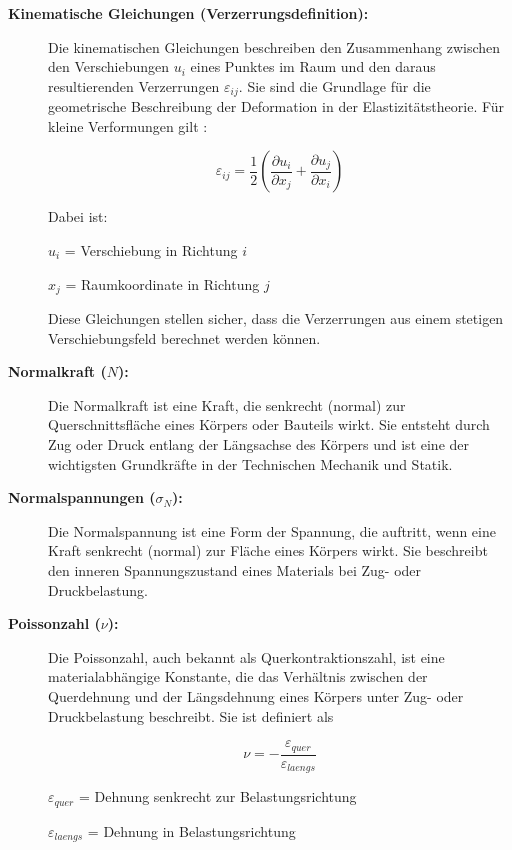 \begin{description}
	\item[\textbf{Kinematische Gleichungen (Verzerrungsdefinition):}] Die kinematischen Gleichungen beschreiben den Zusammenhang zwischen den Verschiebungen $u_i$ eines Punktes im Raum und den daraus resultierenden Verzerrungen $\varepsilon_{ij}$. 
	Sie sind die Grundlage für die geometrische Beschreibung der Deformation in der Elastizitätstheorie. 
	Für kleine Verformungen gilt \cite{elastomechanik:Technische Mechanik 2:Elastostatik}:

	\begin{equation}
		\varepsilon_{ij} = 
		\frac{1}{2} \left( \frac{\partial u_i}{\partial x_j} + \frac{\partial u_j}{\partial x_i} \right)
	\end{equation}
	
	Dabei ist:
	
		$u_i$ = Verschiebung in Richtung $i$
		
		$x_j$ = Raumkoordinate in Richtung $j$
		
	Diese Gleichungen stellen sicher, dass die Verzerrungen aus einem stetigen Verschiebungsfeld berechnet werden können.
	
	\item[\textbf{Normalkraft ($N$):}] Die Normalkraft ist eine Kraft, die senkrecht (normal) zur Querschnittsfläche eines Körpers oder Bauteils wirkt. 
	Sie entsteht durch Zug oder Druck entlang der Längsachse des Körpers und ist eine der wichtigsten Grundkräfte in der Technischen Mechanik und Statik.
	
	\item[\textbf{Normalspannungen ($\sigma_N$):}] Die Normalspannung ist eine Form der Spannung, die auftritt, wenn eine Kraft senkrecht (normal) zur Fläche eines Körpers wirkt. 
	Sie beschreibt den inneren Spannungszustand eines Materials bei Zug- oder Druckbelastung.
	
	\item[\textbf{Poissonzahl ($\nu$):}] Die Poissonzahl, auch bekannt als Querkontraktionszahl, ist eine materialabhängige Konstante, die das Verhältnis zwischen der Querdehnung und der Längsdehnung eines Körpers unter Zug- oder Druckbelastung beschreibt.
	Sie ist definiert als

	\begin{equation}
		\nu=
		-\frac{\varepsilon_{quer}}{\varepsilon_{laengs}}
	\end{equation}

	$\varepsilon_{quer}$ = Dehnung senkrecht zur Belastungsrichtung
	
	$\varepsilon_{laengs}$ = Dehnung in Belastungsrichtung
	

\end{description}
